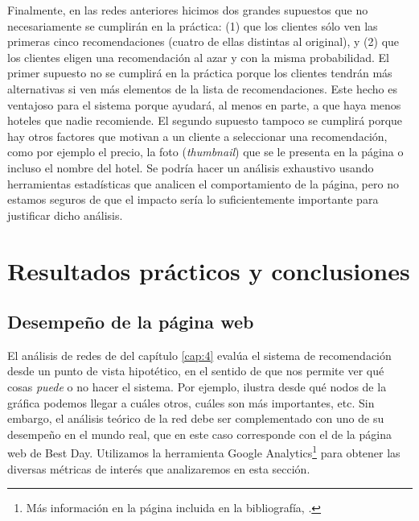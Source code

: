 \documentclass[12pt]{report}
\begin{document}
Finalmente, en las redes anteriores hicimos dos grandes supuestos que no necesariamente se cumplirán en la práctica: (1) que los clientes sólo ven las primeras cinco recomendaciones (cuatro de ellas distintas al original), y (2) que los clientes eligen una recomendación al azar y con la misma probabilidad. El primer supuesto no se cumplirá en la práctica porque los clientes tendrán más alternativas si ven más elementos de la lista de recomendaciones. Este hecho es ventajoso para el sistema porque ayudará, al menos en parte, a que haya menos hoteles que nadie recomiende. El segundo supuesto tampoco se cumplirá porque hay otros factores que motivan a un cliente a seleccionar una recomendación, como por ejemplo el precio, la foto (\emph{thumbnail}) que se le presenta en la página o incluso el nombre del hotel. Se podría hacer un análisis exhaustivo usando herramientas estadísticas que analicen el comportamiento de la página, pero no estamos seguros de que el impacto sería lo suficientemente importante para justificar dicho análisis.


\chapter{Resultados prácticos y conclusiones} \label{cap:5}

\section{Desempeño de la página web}

El análisis de redes de del capítulo \ref{cap:4} evalúa el sistema de recomendación desde un punto de vista hipotético, en el sentido de que nos permite ver qué cosas \emph{puede} o no hacer el sistema. Por ejemplo, ilustra desde qué nodos de la gráfica podemos llegar a cuáles otros, cuáles son más importantes, etc. Sin embargo, el análisis teórico de la red debe ser complementado con uno de su desempeño en el mundo real, que en este caso corresponde con el de la página web de Best Day. Utilizamos la herramienta Google Analytics\footnote{Más información en la página incluida en la bibliografía, \cite{analytics}.} para obtener las diversas métricas de interés que analizaremos en esta sección.
\end{document}
